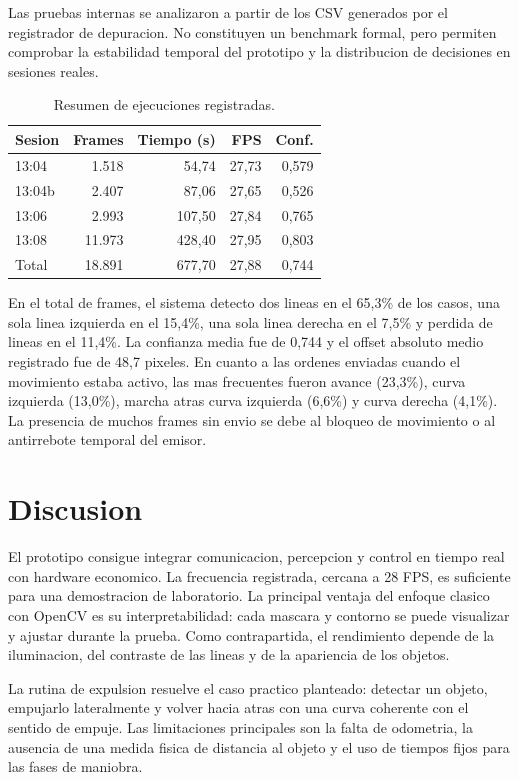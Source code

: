 \documentclass[10pt,a4paper,twocolumn]{article}
\begin{document}
Las pruebas internas se analizaron a partir de los CSV generados por el
registrador de depuracion. No constituyen un benchmark formal, pero permiten
comprobar la estabilidad temporal del prototipo y la distribucion de decisiones
en sesiones reales.

\begin{table}[h]
\centering
\caption{Resumen de ejecuciones registradas.}
\label{tab:resultados}
\begin{tabular}{lrrrr}
\toprule
Sesion & Frames & Tiempo (s) & FPS & Conf. \\
\midrule
13:04 & 1.518 & 54,74 & 27,73 & 0,579 \\
13:04b & 2.407 & 87,06 & 27,65 & 0,526 \\
13:06 & 2.993 & 107,50 & 27,84 & 0,765 \\
13:08 & 11.973 & 428,40 & 27,95 & 0,803 \\
\midrule
Total & 18.891 & 677,70 & 27,88 & 0,744 \\
\bottomrule
\end{tabular}
\end{table}

En el total de frames, el sistema detecto dos lineas en el 65,3\% de los casos,
una sola linea izquierda en el 15,4\%, una sola linea derecha en el 7,5\% y
perdida de lineas en el 11,4\%. La confianza media fue de 0,744 y el offset
absoluto medio registrado fue de 48,7 pixeles. En cuanto a las ordenes enviadas
cuando el movimiento estaba activo, las mas frecuentes fueron avance
(23,3\%), curva izquierda (13,0\%), marcha atras curva izquierda (6,6\%) y curva
derecha (4,1\%). La presencia de muchos frames sin envio se debe al bloqueo de
movimiento o al antirrebote temporal del emisor.

\section{Discusion}

El prototipo consigue integrar comunicacion, percepcion y control en tiempo
real con hardware economico. La frecuencia registrada, cercana a 28 FPS, es
suficiente para una demostracion de laboratorio. La principal ventaja del
enfoque clasico con OpenCV es su interpretabilidad: cada mascara y contorno se
puede visualizar y ajustar durante la prueba. Como contrapartida, el rendimiento
depende de la iluminacion, del contraste de las lineas y de la apariencia de los
objetos.

La rutina de expulsion resuelve el caso practico planteado: detectar un objeto,
empujarlo lateralmente y volver hacia atras con una curva coherente con el
sentido de empuje. Las limitaciones principales son la falta de odometria, la
ausencia de una medida fisica de distancia al objeto y el uso de tiempos fijos
para las fases de maniobra.
\end{document}
